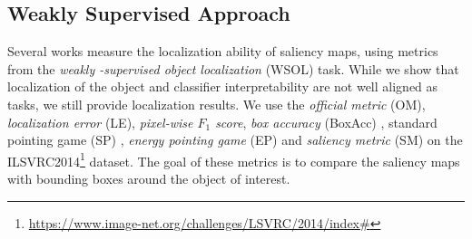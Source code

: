 \subsection{Weakly Supervised Approach}
\label{sec:oc_wsol}
Several works measure the localization ability of saliency maps, using metrics from the \emph{weakly
-supervised object localization} (WSOL) task. While we show that localization of the object and 
classifier interpretability are not well aligned as tasks, we still provide localization results. 
We use the \emph{official metric} (OM), \emph{localization error} (LE), \emph{pixel-wise $F_1$ 
score}, \emph{box accuracy} (BoxAcc) \autocite{choe2020evaluating}, standard pointing game (SP) 
\autocite{zhang2018top}, \emph{energy pointing game} (EP) \autocite{wang2020score} and 
\emph{saliency metric} (SM) \autocite{dabkowski2017real} on the ILSVRC2014\footnote{\url{
https://www.image-net.org/challenges/LSVRC/2014/index\#}} dataset. 
The goal of these metrics is to compare the saliency maps with bounding boxes around the object 
of interest. 


